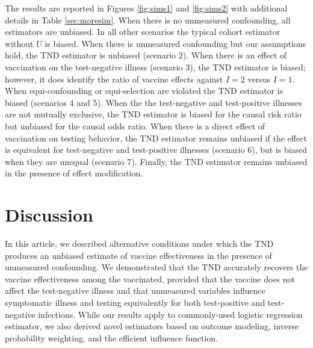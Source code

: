 \documentclass[11pt]{article}
\begin{document}
The results are reported in Figures \ref{fig:sims1} and \ref{fig:sims2} with additional details in Table \ref{sec:moresim}. When there is no unmeasured confounding, all estimators are unbiased. In all other scenarios the typical cohort estimator without $U$ is biased. When there is unmeasured confounding but our assumptions hold, the TND estimator is unbiased (scenario 2). When there is an effect of vaccination on the test-negative illness (scenario 3), the TND estimator is biased; however, it does identify the ratio of vaccine effects against $I = 2$ versus $I = 1$. When equi-confounding or equi-selection are violated the TND estimator is biased (scenarios 4 and 5). When the the test-negative and test-positive illnesses are not mutually exclusive, the TND estimator is biased for the causal risk ratio but unbiased for the causal odds ratio.  When there is a direct effect of vaccination on testing behavior, the TND estimator remains unbiased if the effect is equivalent for test-negative and test-positive illnesses (scenario 6), but is biased when they are unequal (scenario 7). Finally, the TND estimator remains unbiased in the presence of effect modification. %

\section{Discussion} \label{sec:discussion}

In this article, we described alternative conditions under which the TND produces an unbiased estimate of vaccine effectiveness in the presence of unmeasured confounding. We demonstrated that the TND accurately recovers the vaccine effectiveness among the vaccinated, provided that the vaccine does not affect the test-negative illness and that unmeasured variables influence symptomatic illness and testing equivalently for both test-positive and test-negative infections. While our results apply to commonly-used logistic regression estimator, we also derived novel estimators based on outcome modeling, inverse probability weighting, and  the efficient influence function.
\end{document}

